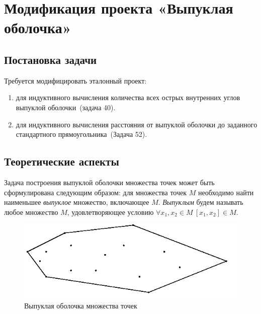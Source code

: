\section{Модификация проекта «Выпуклая оболочка»}

\subsection{Постановка задачи}
Требуется модифицировать эталонный проект:
\begin{enumerate}
\item для индуктивного вычисления количества всех острых внутренних углов выпуклой
оболочки~(задача 40).
\item для индуктивного вычисления расстояния от выпуклой оболочки до заданного
стандартного прямоугольника~(Задача 52).
\end{enumerate}
\subsection{Теоретические аспекты}

Задача построения выпуклой оболочки множества точек может быть сформулирована следующим
образом: для множества точек $M$ необходимо найти наименьшее \emph{выпуклое} множество,
включающее $M$. \emph{Выпуклым} будем называть любое множество $M$, удовлетворяющее
условию
$ \forall x_1, x_2 \in M\ [x_1,x_2]\in M.$

\begin{figure}[ht!]
\begin{center}
\includegraphics[scale=0.6]{images/conv_a_1}
\end{center}
\vspace*{-8mm}
\caption{Выпуклая оболочка множества точек}\label{fig:convex_hull}
\end{figure}

